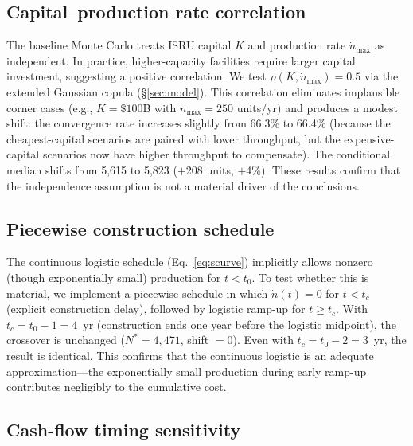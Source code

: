 \documentclass[preprint,12pt]{elsarticle}
\begin{document}
\subsection{Capital--production rate correlation}
\label{sec:k_prod_correlation}

The baseline Monte Carlo treats ISRU capital $K$ and production rate $\dot{n}_{\max}$ as independent. In practice, higher-capacity facilities require larger capital investment, suggesting a positive correlation. We test $\rho(K, \dot{n}_{\max}) = 0.5$ via the extended Gaussian copula (\S\ref{sec:model}). This correlation eliminates implausible corner cases (e.g., $K = \$100$B with $\dot{n}_{\max} = 250$ units/yr) and produces a modest shift: the convergence rate increases slightly from 66.3\% to 66.4\% (because the cheapest-capital scenarios are paired with lower throughput, but the expensive-capital scenarios now have higher throughput to compensate). The conditional median shifts from 5{,}615 to 5{,}823 ($+$208 units, $+$4\%). These results confirm that the independence assumption is not a material driver of the conclusions.

\subsection{Piecewise construction schedule}
\label{sec:piecewise_schedule}

The continuous logistic schedule (Eq.~\ref{eq:scurve}) implicitly allows nonzero (though exponentially small) production for $t < t_0$. To test whether this is material, we implement a piecewise schedule in which $\dot{n}(t) = 0$ for $t < t_c$ (explicit construction delay), followed by logistic ramp-up for $t \geq t_c$. With $t_c = t_0 - 1 = 4$~yr (construction ends one year before the logistic midpoint), the crossover is unchanged ($N^* = 4{,}471$, shift $= 0$). Even with $t_c = t_0 - 2 = 3$~yr, the result is identical. This confirms that the continuous logistic is an adequate approximation---the exponentially small production during early ramp-up contributes negligibly to the cumulative cost.

\subsection{Cash-flow timing sensitivity}
\label{sec:cashflow_timing}
\end{document}
